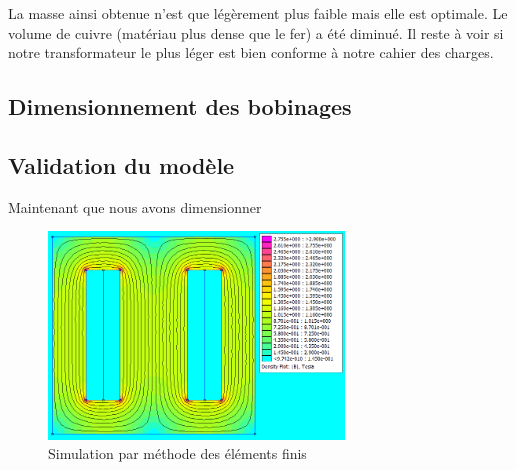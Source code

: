 La masse ainsi obtenue n'est que légèrement plus faible mais elle est optimale. Le volume de cuivre (matériau plus dense que le fer) a été diminué. Il reste à voir si notre transformateur le plus léger est bien conforme à notre cahier des charges.\\

\subsection{Dimensionnement des bobinages}

\subsection{Validation du modèle}
Maintenant que nous avons dimensionner

\begin{figure}
	\begin{center}
	\includegraphics[width=0.7\textwidth]{images/TP1_FEMM_validation}
	\caption{Simulation par méthode des éléments finis}\label{img:FEMMvalidation}
	\end{center}
\end{figure}
\FloatBarrier 
